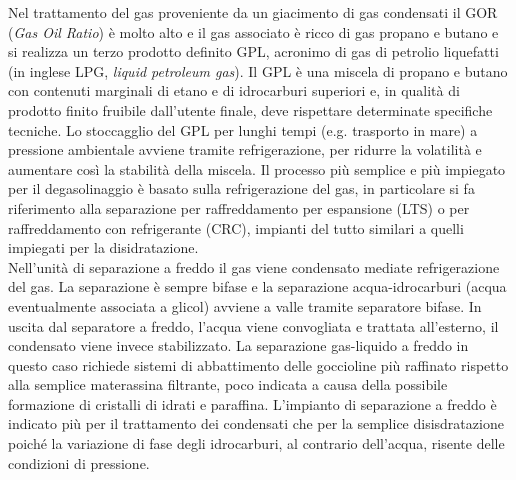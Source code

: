 Nel trattamento del gas proveniente da un giacimento di gas condensati il GOR (\textit{Gas Oil Ratio}) è molto alto e il gas associato è ricco di gas propano e butano e si realizza un terzo prodotto definito GPL, acronimo di gas di petrolio liquefatti (in inglese LPG, \textit{liquid petroleum gas}). Il GPL è una miscela di propano e butano con contenuti marginali di etano e di idrocarburi superiori e, in qualità di prodotto finito fruibile dall'utente finale, deve rispettare determinate specifiche tecniche. Lo stoccagglio del GPL per lunghi tempi (e.g. trasporto in mare) a pressione ambientale avviene tramite refrigerazione, per ridurre la volatilità e aumentare così la stabilità della miscela. Il processo più semplice e più impiegato per il degasolinaggio è basato sulla refrigerazione del gas, in particolare si fa riferimento alla separazione per raffreddamento per espansione (LTS) o per raffreddamento con refrigerante (CRC), impianti del tutto similari a quelli impiegati per la disidratazione.\\
Nell'unità di separazione a freddo il gas viene condensato mediate refrigerazione del gas. La separazione è sempre bifase e la separazione acqua-idrocarburi (acqua eventualmente associata a glicol) avviene a valle tramite separatore bifase. In uscita dal separatore a freddo, l'acqua viene convogliata e trattata all'esterno, il condensato viene invece stabilizzato. La separazione gas-liquido a freddo in questo caso richiede sistemi di abbattimento delle goccioline più raffinato rispetto alla semplice materassina filtrante, poco indicata a causa della possibile formazione di cristalli di idrati e paraffina. L'impianto di separazione a freddo è indicato più per il trattamento dei condensati che per la semplice disisdratazione poiché la variazione di fase degli idrocarburi, al contrario dell'acqua, risente delle condizioni di pressione.

